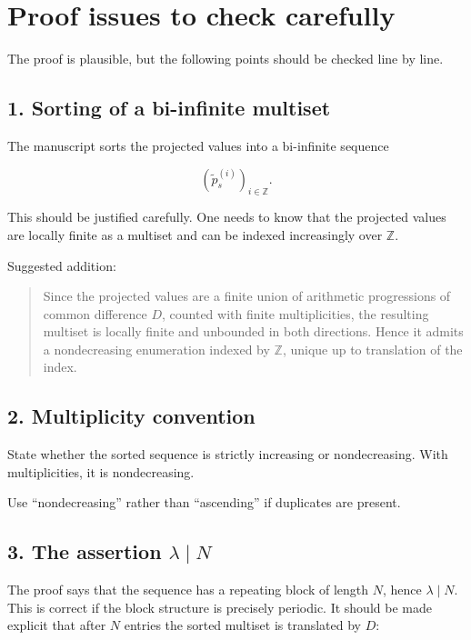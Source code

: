 \documentclass[11pt]{article}
\begin{document}
\section*{Proof issues to check carefully}

The proof is plausible, but the following points should be checked line by
line.

\subsection*{1. Sorting of a bi-infinite multiset}

The manuscript sorts the projected values into a bi-infinite sequence

\[
(\tilde p^{(i)}_s)_{i\in\mathbb Z}.
\]

This should be justified carefully.  One needs to know that the projected
values are locally finite as a multiset and can be indexed increasingly over
\(\mathbb Z\).

Suggested addition:

\begin{quote}
Since the projected values are a finite union of arithmetic progressions of
common difference \(D\), counted with finite multiplicities, the resulting
multiset is locally finite and unbounded in both directions.  Hence it admits
a nondecreasing enumeration indexed by \(\mathbb Z\), unique up to translation
of the index.
\end{quote}

\subsection*{2. Multiplicity convention}

State whether the sorted sequence is strictly increasing or nondecreasing.
With multiplicities, it is nondecreasing.

Use ``nondecreasing'' rather than ``ascending'' if duplicates are present.

\subsection*{3. The assertion \(\lambda\mid N\)}

The proof says that the sequence has a repeating block of length \(N\), hence
\(\lambda\mid N\).  This is correct if the block structure is precisely
periodic.  It should be made explicit that after \(N\) entries the sorted
multiset is translated by \(D\):
\end{document}
